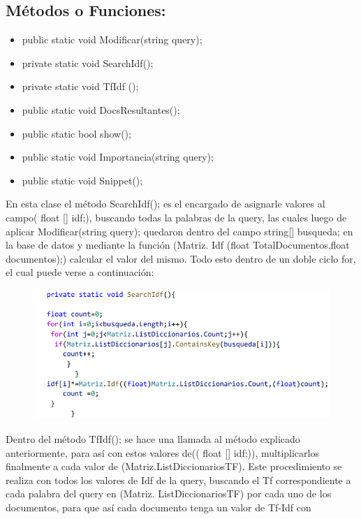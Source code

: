 \documentclass[a4paper,12pt]{article}
\begin{document}
 \subsection*{Métodos o Funciones:}
 \begin{itemize}
   \item public static void Modificar(string query);
   \item private static void SearchIdf();
   \item private static void TfIdf ();
   \item public static void DocsResultantes();
   \item public static bool show();
   \item public static void Importancia(string query);
   \item public static void Snippet();
\end{itemize}
En esta clase el método SearchIdf(); es el encargado de asignarle valores al campo( float [] idf;), 
buscando todas la palabras de la query, las cuales luego de aplicar Modificar(string query);
quedaron dentro del campo string[] busqueda; en la base de datos y mediante la función 
(Matriz. Idf (float TotalDocumentos,float documentos);) calcular el valor del mismo. Todo esto 
dentro de un doble ciclo for, el cual puede verse a continuación:
\begin{figure}[h]
    \includegraphics*{code 3.png}
    
\end{figure}
\linebreak
Dentro del método TfIdf(); se hace una llamada al método explicado anteriormente, para así
con estos valores de(( float [] idf;)), multiplicarlos finalmente a cada valor de (Matriz.ListDiccionariosTF). Este procedimiento se realiza con todos los valores de Idf de la 
query, buscando el Tf correspondiente a cada palabra del query en (Matriz. ListDiccionariosTF)
por cada uno de los documentos, para que así cada documento tenga un valor de Tf-Idf con 
\end{document}
